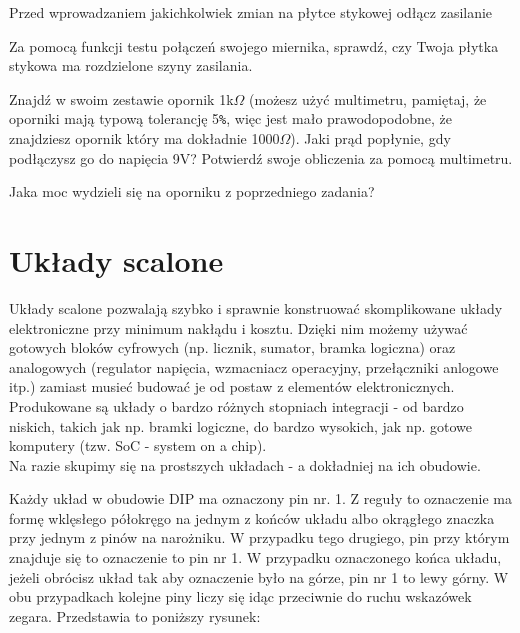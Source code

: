 \documentclass{pdfBooklets}
\begin{document}
\begin{ProTip}{}
  Przed wprowadzaniem jakichkolwiek zmian na płytce stykowej odłącz zasilanie
\end{ProTip}

\begin{Zadanie}{}{}
Za pomocą funkcji testu połączeń swojego miernika, sprawdź, czy Twoja płytka stykowa ma rozdzielone szyny zasilania.
\end{Zadanie}

\begin{Zadanie}{}{}
  Znajdź w swoim zestawie opornik 1k$\Omega$ (możesz użyć multimetru, pamiętaj, że oporniki mają typową tolerancję 5\Verb$%
  za pomocą multimetru.
\end{Zadanie}

\begin{Zadanie}{}{}
  Jaka moc wydzieli się na oporniku z poprzedniego zadania?
\end{Zadanie}



\section{Układy scalone}
Układy scalone pozwalają szybko i sprawnie konstruować skomplikowane układy elektroniczne przy minimum nakłądu i kosztu. Dzięki nim możemy
używać gotowych bloków cyfrowych (np. licznik, sumator, bramka logiczna) oraz analogowych (regulator napięcia, wzmacniacz operacyjny,
przełączniki anlogowe itp.) zamiast musieć budować je od postaw z elementów elektronicznych. Produkowane są układy o bardzo różnych stopniach
integracji - od bardzo niskich, takich jak np. bramki logiczne, do bardzo wysokich, jak np. gotowe komputery (tzw. SoC - system on a chip).
\\

Na razie skupimy się na prostszych układach - a dokładniej na ich obudowie.

Każdy układ w obudowie DIP ma oznaczony pin nr. 1. Z reguły to oznaczenie ma formę wklęsłego półokręgo na jednym z końców układu albo
okrągłego znaczka przy jednym z pinów na narożniku. W przypadku tego drugiego, pin przy którym znajduje się to oznaczenie to pin nr 1.
W przypadku oznaczonego końca układu, jeżeli obrócisz układ tak aby oznaczenie było na górze, pin nr 1 to lewy górny. W obu przypadkach kolejne piny
liczy się idąc przeciwnie do ruchu wskazówek zegara. Przedstawia to poniższy rysunek:
\end{document}
